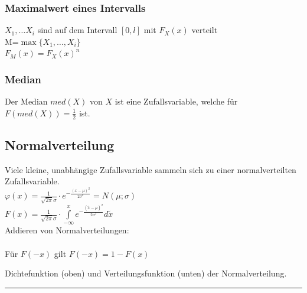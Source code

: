 \begin{multicols}{2}    
  \subsubsection{Maximalwert eines Intervalls}
    $X_1,\ldots X_i$ sind auf dem Intervall $[0,l]$ mit $F_X(x)$ verteilt\\
    M=$\max \{ X_1,\ldots,X_i\} $ \\
    $F_M(x)=F_X(x)^n$ \\
	\columnbreak
  \subsubsection{Median \skript{\pageref{sk-subsubsection-median}}}
    Der Median $med(X)$ von $X$ ist eine Zufallsvariable, welche für
    $F(med(X)) = \frac{1}{2}$ ist.
  
\end{multicols}


\subsection{Normalverteilung}
\begin{minipage}{10cm}
	Viele kleine, unabhängige Zufallsvariable sammeln sich zu einer
	normalverteilten Zufallsvariable.\\
	$\varphi(x)=\frac{1}{\sqrt{2
			\pi}\sigma}\cdot e^{-\frac{(x-\mu)^2}{2\sigma^2}} = N(\mu ; \sigma) $\\ 
	$F(x)=\frac{1}{\sqrt{2\pi}\sigma}\cdot \int\limits^{x}_{-\infty}{e^{-\frac{(\tilde{x} -\mu)^2}{2\sigma^2}}} d\tilde{x} $ \\
	Addieren von Normalverteilungen: \\
	 \\
	Für $F(-x)$ gilt $F(-x) = 1 - F(x)$
\end{minipage}
\begin{minipage}{8cm}
	
	Dichtefunktion (oben) und Verteilungsfunktion (unten) der
	Normalverteilung.
\end{minipage}
\hrule

